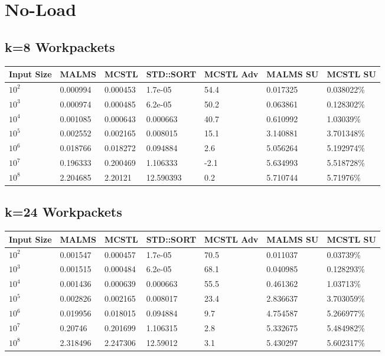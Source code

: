 \documentclass[landscape]{article}
\begin{document}
\section{No-Load}

\subsection*{k=8 Workpackets}
\begin{tabular}{l|l|l|l|l|l|l}
Input Size	& MALMS		& MCSTL		& STD::SORT	& MCSTL Adv	& MALMS SU	& MCSTL SU \\
\hline
$10^2$		& 0.000994	& 0.000453	& 1.7e-05	& 54.4	& 0.017325	& 0.038022\% \\
$10^3$		& 0.000974	& 0.000485	& 6.2e-05	& 50.2	& 0.063861	& 0.128302\% \\
$10^4$		& 0.001085	& 0.000643	& 0.000663	& 40.7	& 0.610992	& 1.03039\% \\
$10^5$		& 0.002552	& 0.002165	& 0.008015	& 15.1	& 3.140881	& 3.701348\% \\
$10^6$		& 0.018766	& 0.018272	& 0.094884	& 2.6	& 5.056264	& 5.192974\% \\
$10^7$		& 0.196333	& 0.200469	& 1.106333	& -2.1	& 5.634993	& 5.518728\% \\
$10^8$		& 2.204685	& 2.20121	& 12.590393	& 0.2	& 5.710744	& 5.71976\% \\
\end{tabular}


\subsection*{k=24 Workpackets}
\begin{tabular}{l|l|l|l|l|l|l}
Input Size	& MALMS		& MCSTL		& STD::SORT	& MCSTL Adv	& MALMS SU	& MCSTL SU \\
\hline
$10^2$		& 0.001547	& 0.000457	& 1.7e-05	& 70.5	& 0.011037	& 0.03739\% \\
$10^3$		& 0.001515	& 0.000484	& 6.2e-05	& 68.1	& 0.040985	& 0.128293\% \\
$10^4$		& 0.001436	& 0.000639	& 0.000663	& 55.5	& 0.461362	& 1.03713\% \\
$10^5$		& 0.002826	& 0.002165	& 0.008017	& 23.4	& 2.836637	& 3.703059\% \\
$10^6$		& 0.019956	& 0.018015	& 0.094884	& 9.7	& 4.754587	& 5.266977\% \\
$10^7$		& 0.20746	& 0.201699	& 1.106315	& 2.8	& 5.332675	& 5.484982\% \\
$10^8$		& 2.318496	& 2.247306	& 12.59012	& 3.1	& 5.430297	& 5.602317\% \\
\end{tabular}
\end{document}
